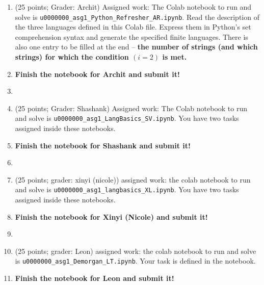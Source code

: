 \documentclass[12pt]{article}
\begin{document}
\begin{enumerate}
\item (25 points; Grader: Archit)
  \noindent Assigned work:
 The Colab notebook to run and solve is
    \verb|u0000000_asg1_Python_Refresher_AR.ipynb|.
 Read the description of the three languages defined in
    this Colab file. Express them in Python's set comprehension syntax
    and generate the specified finite languages.
    There is also one entry to be filled at the end -- {\bf the number of
      strings (and which strings) for which the condition $(i=2)$ is met.}

  \item[] {\bf Finish the notebook for Archit and submit it!    }
\item[]
  
    
\item (25 points; Grader: Shashank)
  \noindent Assigned work:
 The Colab notebook to run and solve is
    \verb|u0000000_asg1_LangBasics_SV.ipynb|.
    You have two tasks assigned inside these notebooks.

  \item[] {\bf Finish the notebook for Shashank and submit it!    }
\item[]

\item (25 points; grader: xinyi (nicole))
  \noindent assigned work:
 the colab notebook to run and solve is
    \verb|u0000000_asg1_langbasics_XL.ipynb|.
    You have two tasks assigned inside these notebooks.

  \item[] {\bf Finish the notebook for Xinyi (Nicole) and submit it!    }
\item[]

\item (25 points; grader: Leon)
  \noindent assigned work:
 the colab notebook to run and solve is
    \verb|u0000000_asg1_Demorgan_LT.ipynb|.
    Your task is defined in the notebook.

  \item[] {\bf Finish the notebook for Leon and submit it!    }        


\end{enumerate}
\end{document}
